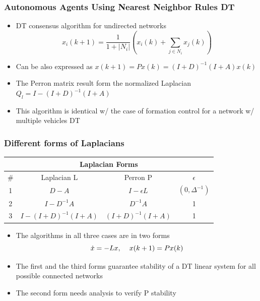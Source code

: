 \documentclass{beamer}
\begin{document}
\begin{frame}
\frametitle{Autonomous Agents Using Nearest Neighbor Rules DT}
\begin{itemize}
\item DT consensus algorithm for undirected networks 
\begin{equation*}
x_i(k+1)=\frac{1}{1+|N_i|}(x_i(k)+\sum_{j\in N_i}x_j(k))
\end{equation*}
\item Can be also expressed as $x(k+1)=Px(k)=(I+D)^{-1}(I+A)x(k)$
\item The Perron matrix result form the normalized Laplacian $Q_l=I-(I+D)^{-1}(I+A)$
\item This algorithm is identical w/ the case of formation control for a network w/ multiple vehicles DT
\end{itemize}
\end{frame}


\begin{frame}
\frametitle{Different forms of Laplacians}
\begin{table}
\centering
\begin{tabular}{|c|c|c|c|}
\hline \multicolumn{4}{|c|}{\scriptsize{\textbf{Laplacian Forms}}} \\
\hline \scriptsize{\#} &  \scriptsize{Laplacian L} & \scriptsize{Perron P} & \scriptsize{\textbf{$\epsilon$}} \\
\hline \scriptsize{1} & \scriptsize{$D-A$}  & \scriptsize{$I-\epsilon L$} & \scriptsize{$(0,\Delta^{-1})$} \\
\hline \scriptsize{2} & \scriptsize{$I-D^{-1}A$}  & \scriptsize{$D^{-1}A$} & \scriptsize{1}  \\
\hline \scriptsize{3} & \scriptsize{$I-(I+D)^{-1}(I+A)$ } & \scriptsize{$(I+D)^{-1}(I+A)$} & \scriptsize{1} \\
\hline
\end{tabular}
\end{table}
\begin{itemize}
\item The algorithms in all three cases are in two forms
\begin{equation*}
\dot{x}=-Lx, \hspace{.4cm}
x(k+1)=Px(k)
\end{equation*}
\item The first and the third forms guarantee stability of a DT linear system for all possible connected networks
\item The second form needs analysis to verify P stability
\end{itemize}
\end{frame}
\end{document}
